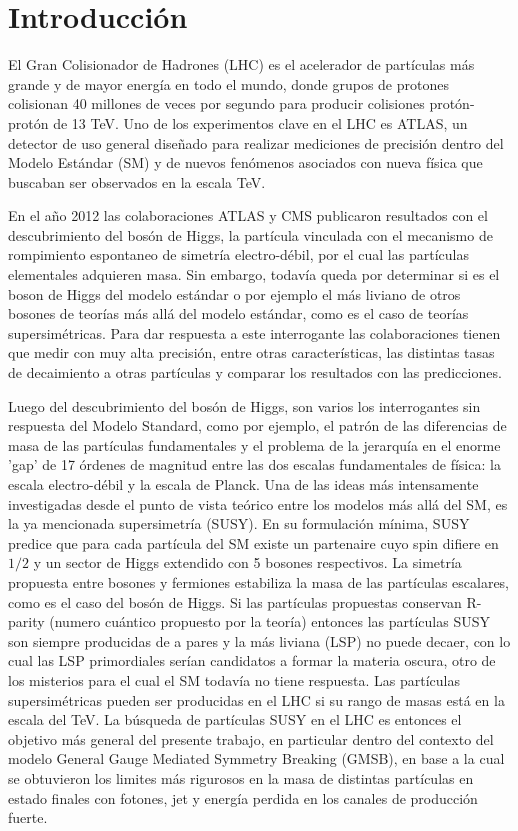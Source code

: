 \chapter*{Introducción}

El Gran Colisionador de Hadrones (LHC) es el acelerador de partículas más grande y de mayor energía en todo el mundo, donde grupos de protones colisionan 40 millones de veces por segundo para producir colisiones protón-protón de 13 TeV. Uno de los experimentos clave en el LHC es ATLAS, un detector de uso general diseñado para realizar mediciones de precisión dentro del Modelo Estándar (SM) y de nuevos fenómenos asociados con nueva física que buscaban ser observados en la escala TeV. 

En el año 2012 las colaboraciones ATLAS y CMS publicaron resultados con el descubrimiento del bosón de Higgs, la partícula vinculada con el mecanismo de rompimiento espontaneo de simetría electro-débil, por el cual las partículas elementales adquieren masa. Sin embargo, todavía queda por determinar si es el boson de Higgs del modelo estándar o por ejemplo el más liviano de otros bosones de teorías más allá del modelo estándar, como es el caso de teorías supersimétricas. Para dar respuesta a este interrogante las colaboraciones tienen que medir con muy alta precisión, entre otras características, las distintas tasas de decaimiento a otras partículas y comparar los resultados con las predicciones.

Luego del descubrimiento del bosón de Higgs, son varios los interrogantes sin respuesta del Modelo Standard, como por ejemplo, el patrón de las diferencias de masa de las partículas fundamentales y el problema de la jerarquía en el enorme 'gap' de 17 órdenes de magnitud entre las dos escalas fundamentales de física: la escala electro-débil y la escala de Planck. Una de las ideas más intensamente investigadas desde el punto de vista teórico entre los modelos más allá del SM, es la ya mencionada supersimetría (SUSY). En su formulación mínima, SUSY predice que para cada partícula del SM existe un partenaire cuyo spin difiere en $1/2$ y un sector de Higgs extendido con 5 bosones respectivos. La simetría propuesta entre bosones y fermiones estabiliza la masa de las partículas escalares, como es el caso del bosón de Higgs. Si las partículas propuestas conservan R-parity (numero cuántico propuesto por la teoría) entonces las partículas SUSY son siempre producidas de a pares y la más liviana (LSP) no puede decaer, con lo cual las LSP primordiales serían candidatos a formar la materia oscura, otro de los misterios para el cual el SM todavía no tiene respuesta. Las partículas supersimétricas pueden ser producidas en el LHC si su rango de masas está en la escala del TeV. La búsqueda de partículas SUSY en el LHC es entonces el objetivo más general del presente trabajo, en particular dentro del contexto del modelo General Gauge Mediated Symmetry Breaking (GMSB), en base a la cual se obtuvieron los limites más rigurosos en la masa de distintas partículas en estado finales con fotones, jet y energía perdida en los canales de producción fuerte.

